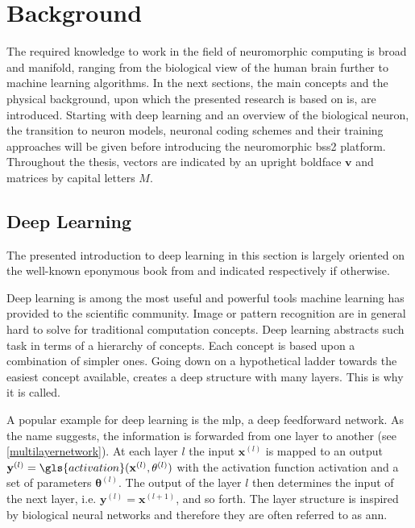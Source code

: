 \chapter{Background}
The required knowledge to work in the field of neuromorphic computing is broad and manifold, ranging from the biological view of the human brain further to machine learning algorithms. In the next sections, the main concepts and the physical background, upon which the presented research is based on is, are introduced. Starting with deep learning and an overview of the biological neuron, the transition to neuron models, neuronal coding schemes and their training approaches will be given before introducing the neuromorphic \gls{bss2} platform. Throughout the thesis, vectors are indicated by an upright boldface $\mathbf{v}$ and matrices by capital letters $M$.
\section{Deep Learning}
\label{deeplearning}
The presented introduction to deep learning in this section is largely oriented on the well-known eponymous book from \cite{Goodfellow-et-al-2016} and indicated respectively if otherwise.

Deep learning is among the most useful and powerful tools machine learning has provided to the scientific community. Image or pattern recognition are in general hard to solve for traditional computation concepts. Deep learning abstracts such task in terms of a hierarchy of concepts. Each concept is based upon a combination of simpler ones. Going down on a hypothetical ladder towards the easiest concept available, creates a deep structure with many layers. This is why it is called.

A popular example for deep learning is the \gls{mlp}, a deep feedforward network. As the name suggests, the information is forwarded from one layer to another (see \cref{multilayernetwork}). At each layer $l$ the input $\mathbf{x}^{(l)}$ is mapped to an output $\mathbf{y}^{(l)} = \gls{activation}(\mathbf{x}^{(l)}, \mathbf{\theta}^{(l)})$ with the activation function \gls{activation} and a set of parameters $\mathbf{\theta}^{(l)}$. The output of the layer $l$ then determines the input of the next layer, i.e. $\mathbf{y}^{(l)} = \mathbf{x}^{(l+1)}$, and so forth. The layer structure is inspired by biological neural networks and therefore they are often referred to as \gls{ann}. 

